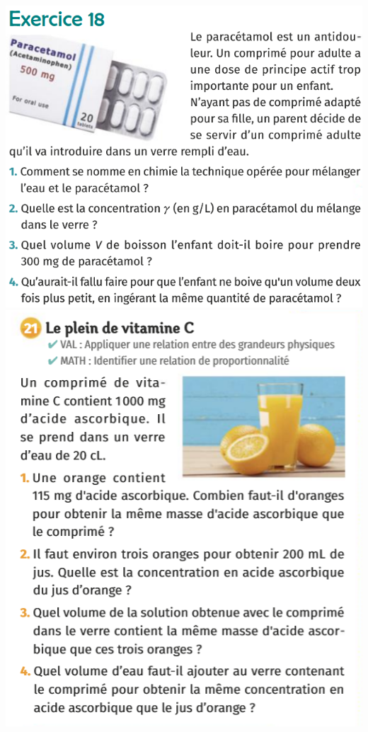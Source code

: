 \begin{center}
\includegraphics[scale=0.9]{Images/Exo_paracetamol.PNG}
\includegraphics[scale=1.5]{Images/Ex_21.png}
\end{center}
\newpage
